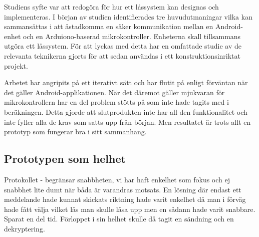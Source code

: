 \documentclass[11pt]{article}
\begin{document}
Studiens syfte var att redogöra för hur ett låssystem kan designas och implementeras. I början av studien identifierades tre huvudutmaningar vilka kan sammansättas i att åstadkomma en säker kommunikation mellan en Android-enhet och en Arduiono-baserad mikrokontroller. Enheterna skall tillsammans utgöra ett låssystem. För att lyckas med detta har en omfattade studie av de relevanta teknikerna gjorts för att sedan användas i ett konstruktionsinriktat projekt.
  

Arbetet har angripits på ett iterativt sätt och har flutit på enligt förväntan när det gäller Android-applikationen. När det däremot gäller mjukvaran för mikrokontrollern har en del problem stötts på som inte hade tagits med i beräkningen.  Detta gjorde att slutprodukten inte har all den funktionalitet och inte fyller alla de krav som satts upp från början. Men resultatet är trots allt en prototyp som fungerar bra i sitt sammanhang.


\subsection{Prototypen som helhet}
Protokollet - begränsar snabbheten, vi har haft enkelhet som fokus och ej snabbhet lite dumt när båda är varandras motsats. En lösning där endast ett meddelande hade kunnat skickats riktning hade varit enkelhet då man i förväg hade fått välja vilket lås man skulle låsa upp men en sådann hade varit snabbare. Sparat en del tid. Förloppet i sin helhet skulle då tagit en sändning och en dekryptering.
\end{document}
